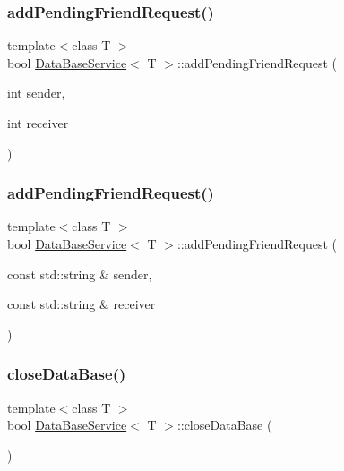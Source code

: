\subsubsection{\texorpdfstring{add\+Pending\+Friend\+Request()}{addPendingFriendRequest()}\hspace{0.1cm}{\footnotesize\ttfamily [1/2]}}
{\footnotesize\ttfamily template$<$class T $>$ \\
bool \mbox{\hyperlink{classDataBaseService}{Data\+Base\+Service}}$<$ T $>$\+::add\+Pending\+Friend\+Request (\begin{DoxyParamCaption}\item[{int}]{sender,  }\item[{int}]{receiver }\end{DoxyParamCaption})\hspace{0.3cm}{\ttfamily [inline]}}

\mbox{\label{classDataBaseService_a655fd576cba8952f982546adacaa6e57}} 
\subsubsection{\texorpdfstring{add\+Pending\+Friend\+Request()}{addPendingFriendRequest()}\hspace{0.1cm}{\footnotesize\ttfamily [2/2]}}
{\footnotesize\ttfamily template$<$class T $>$ \\
bool \mbox{\hyperlink{classDataBaseService}{Data\+Base\+Service}}$<$ T $>$\+::add\+Pending\+Friend\+Request (\begin{DoxyParamCaption}\item[{const std\+::string \&}]{sender,  }\item[{const std\+::string \&}]{receiver }\end{DoxyParamCaption})\hspace{0.3cm}{\ttfamily [inline]}}

\mbox{\label{classDataBaseService_a1106f4f3393298f38e66b8a7b6bc5dc1}} 
\subsubsection{\texorpdfstring{close\+Data\+Base()}{closeDataBase()}}
{\footnotesize\ttfamily template$<$class T $>$ \\
bool \mbox{\hyperlink{classDataBaseService}{Data\+Base\+Service}}$<$ T $>$\+::close\+Data\+Base (\begin{DoxyParamCaption}{ }\end{DoxyParamCaption})\hspace{0.3cm}{\ttfamily [inline]}}

